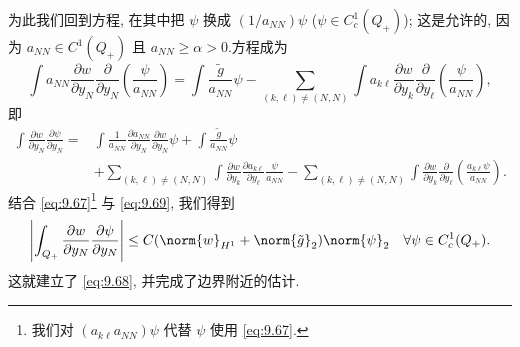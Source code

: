 为此我们回到方程, 在其中把 $\psi$ 换成 $(1/a_{NN})\psi$
($\psi\in C_c^1(Q_+)$); 这是允许的, 因为 $a_{NN}\in C^1(Q_+)$ 且
$a_{NN}\ge\alpha>0$.方程成为
\begin{equation*}
\int a_{NN}\frac{\partial w}{\partial y_N}
\frac{\partial}{\partial y_N}\left(\frac{\psi}{a_{NN}}\right)
=\int\frac{\tilde g}{a_{NN}}\psi
-\sum_{(k,\ell)\neq(N,N)}\int a_{k\ell}\frac{\partial w}{\partial y_k}
\frac{\partial}{\partial y_\ell}\left(\frac{\psi}{a_{NN}}\right),
\end{equation*}
即
\begin{equation}
\begin{aligned}
\int\frac{\partial w}{\partial y_N}\frac{\partial\psi}{\partial y_N}
={}&\int\frac1{a_{NN}}\frac{\partial a_{NN}}{\partial y_N}
\frac{\partial w}{\partial y_N}\psi+\int\frac{\tilde g}{a_{NN}}\psi\\
&+\sum_{(k,\ell)\neq(N,N)}\int\frac{\partial w}{\partial y_k}
\frac{\partial a_{k\ell}}{\partial y_\ell}\frac{\psi}{a_{NN}}
-\sum_{(k,\ell)\neq(N,N)}\int\frac{\partial w}{\partial y_k}
\frac{\partial}{\partial y_\ell}\left(\frac{a_{k\ell}\psi}{a_{NN}}\right).
\end{aligned}
\label{eq:9.69}
\end{equation}
结合 \eqref{eq:9.67}\footnote{我们对 $(a_{k\ell}a_{NN})\psi$ 代替 $\psi$
使用 \eqref{eq:9.67}.} 与 \eqref{eq:9.69}, 我们得到
\begin{equation*}
\left|\int_{Q_+}\frac{\partial w}{\partial y_N}
\frac{\partial\psi}{\partial y_N}\right|
\le C(\norm{w}_{H^1}+\norm{\tilde g}_2)\norm{\psi}_2
\quad\forall\psi\in C_c^1(Q_+).
\end{equation*}
这就建立了 \eqref{eq:9.68}, 并完成了边界附近的估计.

